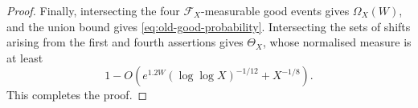\documentclass[10pt,a4paper]{amsart}
\begin{document}
\begin{proof}
Finally, intersecting the four \(\mathscr F_X\)-measurable good events
gives \(\Omega_X(W)\), and the union bound gives
\eqref{eq:old-good-probability}. Intersecting the sets of shifts arising
from the first and fourth assertions gives \(\Theta_X\), whose normalised
measure is at least
\[
 1-O\left(
 e^{1.2W}(\log\log X)^{-1/12}+X^{-1/8}
 \right).
\]
This completes the proof.
\end{proof}
\end{document}
